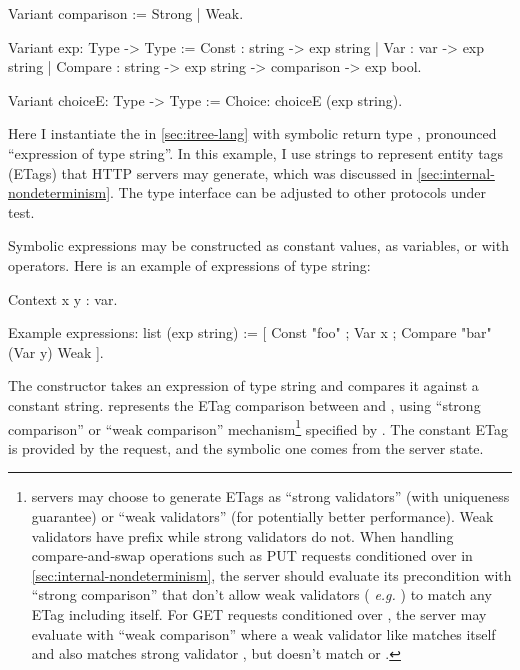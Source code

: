 \begin{coq}
  Variant comparison := Strong | Weak.

  Variant exp: Type -> Type :=
    Const    : string -> exp string
  | Var      : var    -> exp string
  | Compare  : string -> exp string -> comparison -> exp bool.

  Variant choiceE: Type -> Type :=
    Choice: choiceE (exp string).
\end{coq}

Here I instantiate the  in \autoref{sec:itree-lang} with symbolic
return type , pronounced ``expression of type string''.  In
this example, I use strings to represent entity tags (ETags) that HTTP servers
may generate, which was discussed in \autoref{sec:internal-nondeterminism}.  The
type interface can be adjusted to other protocols under test.

Symbolic expressions may be constructed as constant values, as variables, or
with operators.  Here is an example of expressions of type string:
\begin{coq}
  Context x y : var.

  Example expressions: list (exp string) :=
    [ Const   "foo"
    ; Var      x
    ; Compare "bar" (Var y) Weak
    ].
\end{coq}

The  constructor takes an expression of type string and compares it
against a constant string.   represents the ETag
comparison between  and , using ``strong comparison'' or ``weak
comparison'' mechanism\footnote{\http servers may choose to generate ETags as
``strong validators'' (with uniqueness guarantee) or ``weak validators'' (for
potentially better performance).  Weak validators have prefix  while
strong validators do not.  When handling compare-and-swap operations such as PUT
requests conditioned over  in
\autoref{sec:internal-nondeterminism}, the server should evaluate its
precondition with ``strong comparison'' that don't allow weak validators ({\it
e.g.} ) to match any ETag including itself.  For GET requests
conditioned over , the server may evaluate with ``weak
comparison'' where a weak validator like  matches itself and
also matches strong validator , but doesn't match 
or .} specified by .  The constant ETag is provided by
the request, and the symbolic one comes from the server state.

